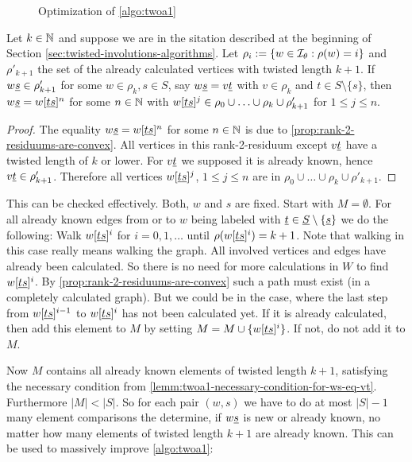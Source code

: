 \begin{figure}[ht]
	\centering
	
	\caption{Optimization of \ref{algo:twoa1}}
	\label{fig:optimization-of-twoa1}
\end{figure}

\begin{lemm}
	Let $k \in \mathbb{N}$ and suppose we are in the sitation described at the beginning of Section \ref{sec:twisted-involutions-algorithms}. Let $\rho_i := \{ w \in \mathcal{I}_{\theta} : \rho(w) = i \}$ and $\rho'_{k+1}$ the set of the already calculated vertices with twisted length $k+1$. If $w \underline{s} \in \rho'_{k+1}$ for some $w \in \rho_k, s \in S$, say $w \underline{s} = v \underline{t}$ with $v \in \rho_k$ and $t \in S \setminus \{s\}$, then $w \underline{s} = w[\underline{t} \underline{s}]^n$ for some $n \in \mathbb{N}$ with $w[\underline{t} \underline{s}]^j \in \rho_0 \cup \ldots \cup \rho_k \cup \rho'_{k+1}$ for $1 \leq j \leq n$.

	\begin{proof}
		The equality $w \underline{s} = w[\underline{t} \underline{s}]^n$ for some $n \in \mathbb{N}$ is due to \ref{prop:rank-2-residuums-are-convex}. All vertices in this rank-2-residuum except $v \underline{t}$ have a twisted length of $k$ or lower. For $v \underline{t}$ we supposed it is already known, hence $v \underline{t} \in \rho'_{k+1}$. Therefore all vertices $w[\underline{t} \underline{s}]^j$, $1 \leq j \leq n$ are in $\rho_0 \cup \ldots \cup \rho_k \cup \rho'_{k+1}$.
	\end{proof}
\end{lemm}

This can be checked effectively. Both, $w$ and $s$ are fixed. Start with $M = \emptyset$. For all already known edges from or to $w$ being labeled with $\underline{t} \in \underline{S} \setminus \{\underline{s}\}$ we do the following: Walk $w[\underline{t} \underline{s}]^i$ for $i = 0,1,\ldots$ until $\rho(w[\underline{t} \underline{s}]^i) = k + 1$. Note that walking in this case really means walking the graph. All involved vertices and edges have already been calculated. So there is no need for more calculations in $W$ to find $w[\underline{t} \underline{s}]^i$. By \ref{prop:rank-2-residuums-are-convex} such a path must exist (in a completely calculated graph). But we could be in the case, where the last step from $w[\underline{t} \underline{s}]^{i-1}$ to $w[\underline{t} \underline{s}]^{i}$ has not been calculated yet. If it is already calculated, then add this element to $M$ by setting $M = M \cup \{ w[\underline{t} \underline{s}]^{i} \}$. If not, do not add it to $M$.

Now $M$ contains all already known elements of twisted length $k+1$, satisfying the necessary condition from \ref{lemm:twoa1-necessary-condition-for-ws-eq-vt}. Furthermore $|M| < |S|$. So for each pair $(w,s)$ we have to do at most $|S|-1$ many element comparisons the determine, if $w \underline{s}$ is new or already known, no matter how many elements of twisted length $k+1$ are already known. This can be used to massively improve \ref{algo:twoa1}:

